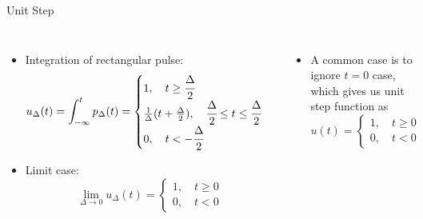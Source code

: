 \documentclass[aspectratio=169,xcolor=dvipsnames,svgnames,x11names,fleqn]{beamer}
\begin{document}
\begin{frame}{Unit Step}

    \small
\begin{columns}
    \begin{itemize}
        \item  Integration of rectangular pulse:
        \begin{equation*}
            \begin{aligned}
                u_\Delta(t)= \int_{ -\infty}^{t}   p_\Delta(t) = \begin{cases}
                    1,\quad t \geq \cfrac{\Delta}{2}\\
                    \tfrac{1}{\Delta}(t + \tfrac{\Delta}{2}), \quad \cfrac{\Delta}{2} \leq t \leq \cfrac{\Delta}{2}\\
                    0, \quad t < -\cfrac{\Delta}{2}
                \end{cases}
            \end{aligned}
        \end{equation*}
        \item Limit case:
        \begin{equation*}
           \lim_{\Delta \to 0}u_\Delta (t) = \begin{cases}
                    1,\quad t \geq 0\\
                    0, \quad t <0
                \end{cases}
        \end{equation*}
      
    \end{itemize}
    \begin{itemize}
          \item A common case is to ignore $t=0$ case, which gives us unit step function as
        \begin{equation*}
        u(t) = \begin{cases}
                    1,\quad t \geq 0\\
                    0, \quad t <0
                \end{cases}
        \end{equation*}
    \end{itemize}
\includegraphics[width=0.35\linewidth,trim=0 0 0 0cm,clip]{figures/unitstep.png}
\end{columns}
\end{frame}
\end{document}
